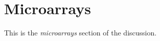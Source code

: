 \section{Microarrays}
\label{microarray-discussion}

This is the \emph{microarrays} section of the discussion.

\clearpage

